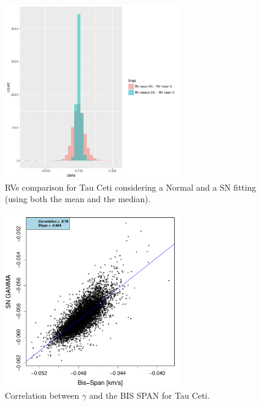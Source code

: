 \documentclass{aa}
\begin{document}
%
\begin{figure}[htbp]
   \centering
\includegraphics[height = 3in]{[0]TauCeti_HistogramsDiff.pdf} 
   \caption{RVs comparison for Tau Ceti considering a Normal and a SN fitting (using both the mean and the median).}
   \label{fig:Tau Ceti:RV}
\end{figure}
%
\begin{figure}[htbp]
   \centering
\includegraphics[height = 3in]{HD10700_[2]gamma_vs_bisspan.pdf} 
   \caption{Correlation between $\gamma$ and the BIS SPAN for Tau Ceti.}
   \label{fig:Tau:corr.gamma}
\end{figure}
%
\end{document}
